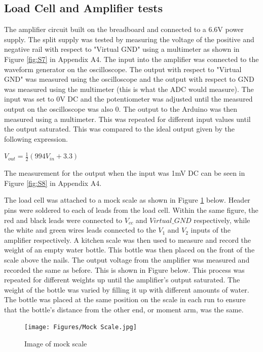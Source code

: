 \documentclass[class=report,11pt,crop=false]{standalone}
\begin{document}
	\subsection{Load Cell and Amplifier tests}
	The amplifier circuit built on the breadboard and connected to a 6.6V power supply. The split supply was tested by measuring the voltage of the positive and negative rail with respect to "Virtual GND" using a multimeter as shown in Figure \ref{fig:S7} in Appendix A4.
	The input into the amplifier was connected to the waveform generator on the oscilloscope. The output with respect to "Virtual GND" was measured using the oscilloscope and the output with respect to GND was measured using the multimeter (this is what the ADC would measure). The input was set to 0V DC and the potentiometer was adjusted until the measured output on the oscilloscope was also 0. The output to the Arduino was then measured using a multimeter. This was repeated for different input values until the output saturated. This was compared to the ideal output given by the following expression.
	\begin{center}
		$V_{out}=\frac{1}{2}\left(994V_{in} + 3.3\right)$ \\
	\end{center}
	
	The measurement for the output when the input was 1mV DC can be seen in Figure \ref{fig:S8} in Appendix A4.
	
	The load cell was attached to a mock scale as shown in Figure \ref{fig:S9} below. Header pins were soldered to each of leads from the load cell. Within the same figure, the red and black leads were connected to $V_{cc}$ and $Virtual\_GND$ respectively, while the white and green wires leads connected to the $V_1$ and $V_2$ inputs of the amplifier respectively. A kitchen scale was then used to measure and record the weight of an empty water bottle. This bottle was then placed on the front of the scale above the nails. The output voltage from the amplifier was measured and recorded the same as before. This is shown in Figure below. This process was repeated for different weights up until the amplifier's output saturated. The weight of the bottle was varied by filling it up with different amounts of water. The bottle was placed at the same position on the scale in each run to ensure that the bottle's distance from the other end, or moment arm, was the same. 
	\begin{figure}[h!]
		\centering
		\texttt{[image: Figures/Mock Scale.jpg]}
		\caption{Image of mock scale}
		\label{fig:S9}
	\end{figure}
	
\end{document}
